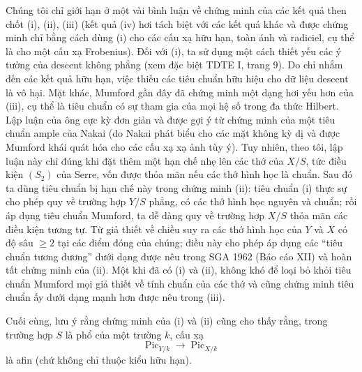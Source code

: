 Chúng tôi chỉ giới hạn ở một vài bình luận về chứng minh của các kết quả then
chốt (i), (ii), (iii) (kết quả (iv) hơi tách biệt với các kết quả khác và
được chứng minh chỉ bằng cách dùng (i) cho các cấu xạ hữu hạn, toàn ánh và
radiciel, cụ thể là cho một cấu xạ Frobenius). Đối với (i), ta sử dụng một
cách thiết yếu các ý tưởng của descent không phẳng (xem đặc biệt TDTE I,
trang 9). Do chỉ nhắm đến các kết quả hữu hạn, việc thiếu các tiêu chuẩn hữu
hiệu cho dữ liệu descent là vô hại. Mặt khác, Mumford gần đây đã chứng minh
một dạng hơi yếu hơn của (iii), cụ thể là tiêu chuẩn có sự tham gia của mọi
hệ số trong đa thức Hilbert. Lập luận của ông cực kỳ đơn giản và được gợi ý từ
chứng minh của một tiêu chuẩn ample của Nakai (do Nakai phát biểu cho các mặt
không kỳ dị và được Mumford khái quát hóa cho các cấu xạ xạ ảnh tùy ý). Tuy
nhiên, theo tôi, lập luận này chỉ đúng khi đặt thêm một hạn chế nhẹ lên các thớ
của $X/S$, tức điều kiện $(S_2)$ của Serre, vốn được thỏa mãn nếu các thớ hình
học là chuẩn. Sau đó ta dùng tiêu chuẩn bị hạn chế này trong chứng minh (ii):
tiêu chuẩn (i) thực sự cho phép quy về trường hợp $Y/S$ phẳng, có các thớ hình
học nguyên và chuẩn; rồi áp dụng tiêu chuẩn Mumford, ta dễ dàng quy về trường
hợp $X/S$ thỏa mãn các điều kiện tương tự. Từ giả thiết về chiều suy ra các
thớ hình học của $Y$ và $X$ có độ sâu $\geq2$ tại các điểm đóng của chúng;
điều này cho phép áp dụng các ``tiêu chuẩn tương đương'' dưới dạng được nêu
trong SGA 1962 (Báo cáo XII) và hoàn tất chứng minh của (ii). Một khi đã có
(i) và (ii), không khó để loại bỏ khỏi tiêu chuẩn Mumford mọi giả thiết về
tính chuẩn của các thớ và cũng chứng minh tiêu chuẩn ấy dưới dạng mạnh hơn
được nêu trong (iii).

Cuối cùng, lưu ý rằng chứng minh của (i) và (ii) cũng cho thấy rằng, trong
trường hợp $S$ là phổ của một trường $k$, cấu xạ
\[
\operatorname{Pic}_{Y/k}\longrightarrow\operatorname{Pic}_{X/k}
\]
là afin (chứ không chỉ thuộc kiểu hữu hạn).

\par
